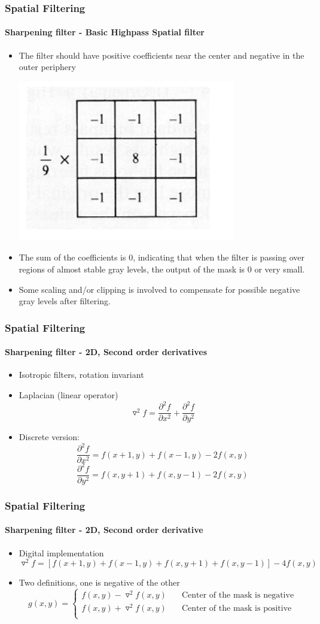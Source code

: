 \documentclass{beamer}
\begin{document}
\begin{frame}
\frametitle{Spatial Filtering}
\framesubtitle{Sharpening filter - Basic Highpass Spatial filter}
\begin{itemize}
\item The filter should have positive coefficients near the center and negative in the outer periphery
\begin{center}\includegraphics[scale=0.3]{images/HPF.png}\end{center}
\item The sum of the coefficients is 0, indicating that when the filter is passing over regions of almost stable gray levels, the output of the mask is 0 or very small.
\item Some scaling and/or clipping is involved to compensate for possible negative gray levels after filtering.
\end{itemize}
\end{frame}
\begin{frame}
\frametitle{Spatial Filtering}
\framesubtitle{Sharpening filter - 2D, Second order derivatives}
\begin{itemize}
\item Isotropic filters, rotation invariant 
\item Laplacian (linear operator)
$$\triangledown^2 f = \frac{\partial^2 f}{\partial x^2}+ \frac{\partial^2 f}{\partial y^2}$$
\item Discrete version: 
$$\frac{\partial^2 f}{\partial x^2} = f(x+1,y) + f(x-1,y) -2f(x,y)$$
$$\frac{\partial^2 f}{\partial y^2} = f(x,y+1) + f(x,y-1) -2f(x,y)$$ 
\end{itemize}
\end{frame}
\begin{frame}
\frametitle{Spatial Filtering}
\framesubtitle{Sharpening filter - 2D, Second order derivative}
\begin{itemize}
\item Digital implementation 
$$\triangledown^2 f = [f(x+1,y)+f(x-1,y)+f(x,y+1)+f(x,y-1)]-4f(x,y)$$
\item Two definitions, one is negative of the other
\[ g(x,y) =
  \begin{cases}
    f(x,y)-\triangledown^2 f(x,y)  & \quad \text{Center of the mask is negative} \\
    f(x,y)+\triangledown^2 f(x,y)  & \quad \text{Center of the mask is positive} \\
  \end{cases}
\]
\end{itemize}
\end{frame}
\end{document}

